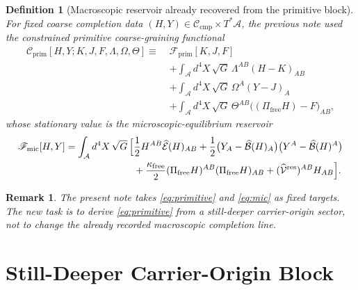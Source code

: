 \documentclass[11pt]{article}
\newcommand{\Sub}{\mathcal A}
\newcommand{\ResidualLift}{\widehat{\mathcal V}^{\mathrm{res}}}
\newcommand{\SubEinLin}{\widehat{\mathcal E}}
\newcommand{\SubGaugeVec}{\widehat{\mathcal B}}
\newcommand{\FreeProj}{\Pi_{\mathrm{free}}}
\newcommand{\GaugeAux}{Y}
\newcommand{\CompClass}{\mathscr C_{\mathrm{cmp}}}
\newcommand{\MicFunctional}{\mathscr F_{\mathrm{mic}}}
\newcommand{\PrimFunctional}{\mathscr F_{\mathrm{prim}}}
\newcommand{\FreeStiff}{\kappa_{\mathrm{free}}}
\newcommand{\PrimStrain}{K}
\newcommand{\PrimNeutral}{J}
\newcommand{\PrimFree}{F}
\newcommand{\StrainMult}{\Lambda}
\newcommand{\NeutralMult}{\Omega}
\newcommand{\FreeMult}{\Theta}
\newtheorem{definition}{Definition}
\newtheorem{remark}{Remark}
\begin{document}
\begin{definition}[Macroscopic reservoir already recovered from the primitive block]
\label{def:mic}
For fixed coarse completion data \((H,\GaugeAux)\in\CompClass\times T^*\Sub\), the previous note used the constrained primitive coarse-graining functional
\begin{equation}
\begin{aligned}
\mathscr C_{\mathrm{prim}}[H,\GaugeAux;\PrimStrain,\PrimNeutral,\PrimFree,\StrainMult,\NeutralMult,\FreeMult]
\equiv\;
&\PrimFunctional[\PrimStrain,\PrimNeutral,\PrimFree]
\\
&+\int_{\Sub} d^4X\,\sqrt{G}\,
\StrainMult^{AB}(H-\PrimStrain)_{AB}
\\
&+\int_{\Sub} d^4X\,\sqrt{G}\,
\NeutralMult^A(\GaugeAux-\PrimNeutral)_A
\\
&+\int_{\Sub} d^4X\,\sqrt{G}\,
\FreeMult^{AB}\bigl((\FreeProj H)-\PrimFree\bigr)_{AB},
\end{aligned}
\label{eq:Cprim}
\end{equation}
whose stationary value is the microscopic-equilibrium reservoir
\begin{equation}
\begin{aligned}
\MicFunctional[H,\GaugeAux]
=
\int_{\Sub} d^4X\,\sqrt{G}\,
\Bigl[
&\frac12 H^{AB}\SubEinLin(H)_{AB}
+\frac12\bigl(\GaugeAux_A-\SubGaugeVec(H)_A\bigr)
\bigl(\GaugeAux^A-\SubGaugeVec(H)^A\bigr)
\\
&+\frac{\FreeStiff}{2}(\FreeProj H)^{AB}(\FreeProj H)_{AB}
+(\ResidualLift)^{AB}H_{AB}
\Bigr].
\end{aligned}
\label{eq:mic}
\end{equation}
\end{definition}

\begin{remark}
The present note takes \eqref{eq:primitive} and \eqref{eq:mic} as fixed targets. The new task is to derive \eqref{eq:primitive} from a still-deeper carrier-origin sector, not to change the already recorded macroscopic completion line.
\end{remark}

\section{Still-Deeper Carrier-Origin Block}
\end{document}
